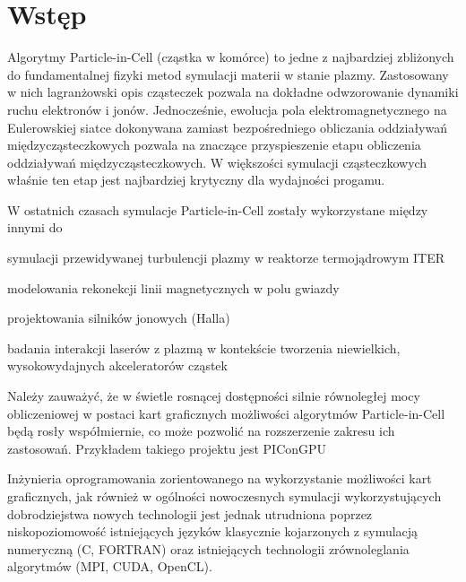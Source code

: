 \section[Wstęp]{Wstęp} %
Algorytmy Particle-in-Cell (cząstka w komórce) to jedne z najbardziej zbliżonych do fundamentalnej fizyki
metod symulacji materii w stanie plazmy. Zastosowany w nich lagranżowski opis cząsteczek pozwala na dokładne
odwzorowanie dynamiki ruchu elektronów i jonów. Jednocześnie, ewolucja pola elektromagnetycznego na Eulerowskiej
siatce dokonywana zamiast bezpośredniego obliczania oddziaływań międzycząsteczkowych pozwala na znaczące
przyspieszenie etapu obliczenia oddziaływań międzycząsteczkowych. W większości symulacji cząsteczkowych właśnie
ten etap jest najbardziej krytyczny dla wydajności progamu.

W ostatnich czasach symulacje Particle-in-Cell zostały wykorzystane między innymi do
\item symulacji przewidywanej turbulencji plazmy w reaktorze termojądrowym ITER 
\item modelowania rekonekcji linii magnetycznych w polu gwiazdy 
\item projektowania silników jonowych (Halla) 
\item badania interakcji laserów z plazmą w kontekście tworzenia niewielkich,
    wysokowydajnych akceleratorów cząstek 

    Należy zauważyć, że w świetle rosnącej dostępności silnie równoległej mocy obliczeniowej w postaci kart graficznych
    możliwości algorytmów Particle-in-Cell będą rosły współmiernie, co może pozwolić na rozszerzenie zakresu ich zastosowań.
    Przykładem takiego projektu jest PIConGPU 

    Inżynieria oprogramowania zorientowanego na wykorzystanie możliwości kart graficznych,
    jak również w ogólności nowoczesnych symulacji wykorzystujących dobrodziejstwa nowych technologii
    jest jednak utrudniona poprzez niskopoziomowość istniejących języków klasycznie
    kojarzonych z symulacją numeryczną (C, FORTRAN) oraz istniejących technologii zrównoleglania
    algorytmów (MPI, CUDA, OpenCL).

